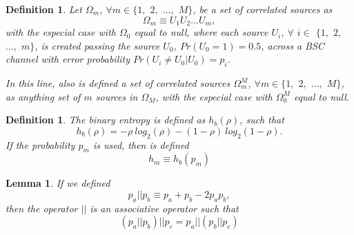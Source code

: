 \documentclass[a4paper,10pt]{article}
\newtheorem{definition}[mytheorem]{Definition}
\newtheorem{mylemma}[mytheorem]{Lemma}
\begin{document}
\begin{mdframed}[style=MDFStyGrayScreen]
\begin{definition}
 \label{def:omega}
Let $\Omega_m$, $\forall m \in \{1,$ $2,$ $...,$ $M\}$, be a set of correlated 
sources as
\begin{equation}
\label{eq:omega}
 \Omega_m \equiv U_1 U_2 ... U_m,
\end{equation}
with the especial case with $\Omega_0$ equal to null,
where each source $U_i$, $\forall$ $i \in$ $\{1,$ $2,$ $...,$ $m\}$, is created 
passing the source $U_0$, $Pr(U_0=1)=0.5$, across a BSC channel  with error 
probability $Pr(U_i \ne U_0 | U_0)=p_i$.

In this line, also is defined a set of correlated sources $\Omega^{M}_m$, 
$\forall m \in \{1,$ $2,$ $...,$ $M\}$, as anything set of $m$  sources in $\Omega_M$, 
with the especial case with $\Omega^M_0$ equal to null.
\end{definition}
\end{mdframed}
\begin{mdframed}[style=MDFStyGrayScreen]
\begin{definition}
 \label{def:hb}
The binary entropy is defined as $h_b(\rho)$, such that
\begin{equation}
\label{eq:hb1}
h_b(\rho)=- \rho ~ log_2(\rho) - (1-\rho) ~ log_2(1-\rho).
\end{equation}
If the probability $p_m$ is used, then is defined
\begin{equation}
\label{eq:hi}
h_m \equiv h_b(p_m)
\end{equation}
\end{definition}
\end{mdframed}
\begin{mdframed}[style=MDFStyGrayScreen]
\begin{mylemma}
\label{lemma:def} 
If we defined 
\begin{equation} \label{eq:ab2}
 p_a || p_b \equiv p_a + p_b -2 p_a p_b, 
\end{equation} 
then the operator $||$ is an associative operator such that
\begin{equation} \label{eq:def1}
 (p_a || p_b)||p_c = p_a || (p_b||p_c)
\end{equation} 
\end{mylemma}
\end{mdframed}
\end{document}
